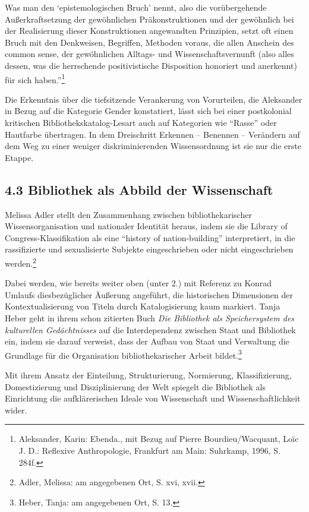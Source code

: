 \documentclass[a4paper,
fontsize=11pt,
oneside,
numbers=noperiodatend,
parskip=half-,
bibliography=totoc,
final
]{scrartcl}
\begin{document}
Was man den \enquote*{epistemologischen Bruch} nennt, also die
vorübergehende Außerkraftsetzung der gewöhnlichen Präkonstruktionen und
der gewöhnlich bei der Realisierung dieser Konstruktionen angewandten
Prinzipien, setzt oft einen Bruch mit den Denkweisen, Begriffen,
Methoden voraus, die allen Anschein des common sense, der gewöhnlichen
Alltags- und Wissenschaftsvernunft (also alles dessen, was die
herrschende positivistische Disposition honoriert und anerkennt) für
sich haben.''\footnote{Aleksander, Karin: Ebenda., mit Bezug auf Pierre
  Bourdieu/Wacquant, Loïc J. D.: Reflexive Anthropologie, Frankfurt am
  Main: Suhrkamp, 1996, S. 284f.}

Die Erkenntnis über die tiefsitzende Verankerung von Vorurteilen, die
Aleksander in Bezug auf die Kategorie Gender konstatiert, lässt sich bei
einer postkolonial kritischen Bibliothekskatalog-Lesart auch auf
Kategorien wie \enquote{Rasse} oder Hautfarbe übertragen. In dem
Dreischritt Erkennen -- Benennen -- Verändern auf dem Weg zu einer
weniger diskriminierenden Wissensordnung ist sie nur die erste Etappe.

\hypertarget{bibliothek-als-abbild-der-wissenschaft}{%
\subsection{4.3 Bibliothek als Abbild der
Wissenschaft}\label{bibliothek-als-abbild-der-wissenschaft}}

Melissa Adler stellt den Zusammenhang zwischen bibliothekarischer
Wissensorganisation und nationaler Identität heraus, indem sie die
Library of Congress-Klassifikation als eine \enquote{history of
nation-building} interpretiert, in die rassifizierte und sexualisierte
Subjekte eingeschrieben oder nicht eingeschrieben werden.\footnote{Adler,
  Melissa: am angegebenen Ort, S. xvi, xvii.}

Dabei werden, wie bereits weiter oben (unter 2.) mit Referenz zu Konrad
Umlaufs diesbezüglicher Äußerung angeführt, die historischen Dimensionen
der Kontextualisierung von Titeln durch Katalogisierung kaum markiert.
Tanja Heber geht in ihrem schon zitierten Buch \emph{Die Bibliothek als
Speichersystem des kulturellen Gedächtnisses} auf die Interdependenz
zwischen Staat und Bibliothek ein, indem sie darauf verweist, dass der
Aufbau von Staat und Verwaltung die Grundlage für die Organisation
bibliothekarischer Arbeit bildet.\footnote{Heber, Tanja: am angegebenen
  Ort, S. 13.}

Mit ihrem Ansatz der Einteilung, Strukturierung, Normierung,
Klassifizierung, Domestizierung und Disziplinierung der Welt spiegelt
die Bibliothek als Einrichtung die aufklärerischen Ideale von
Wissenschaft und Wissenschaftlichkeit wider.
\end{document}
